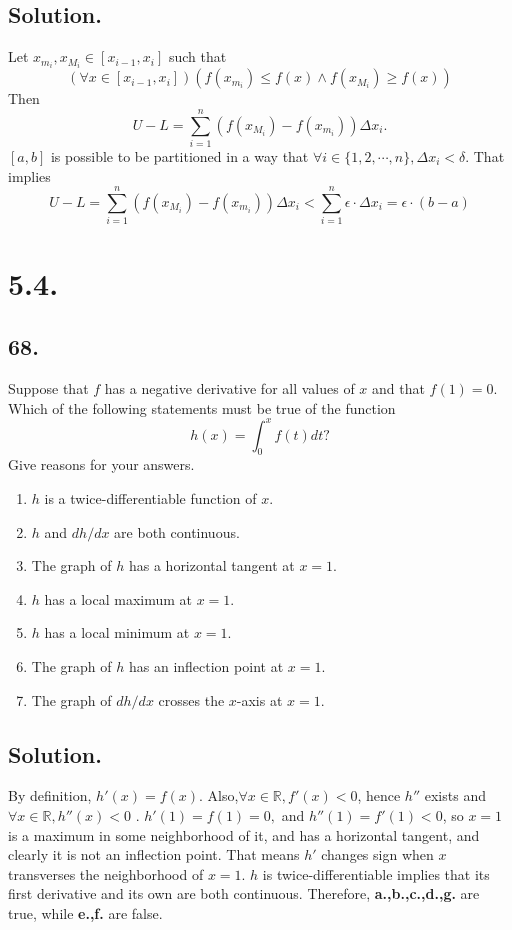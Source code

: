\documentclass{article}
\begin{document}
\subsection*{Solution.}
Let $x_{m_i},x_{M_i}\in [x_{i-1},x_i]$ such that 
\[(\forall x\in [x_{i-1},x_i])(f(x_{m_i})\leq f(x)\land f(x_{M_i})\geq f(x))\]
Then 
\[U-L=\sum_{i=1}^n(f(x_{M_i})-f(x_{m_i}))\Delta x_i.\]
$[a,b]$ is possible to be partitioned in a way that $\forall i\in\{1,2,\cdots,n\}, \Delta x_i<\delta$. That implies 
\[U-L=\sum_{i=1}^n(f(x_{M_i})-f(x_{m_i}))\Delta x_i<\sum_{i=1}^n\epsilon\cdot\Delta x_i=\epsilon\cdot (b-a)\]
\section*{5.4.}
\subsection*{68.}
Suppose that $f$ has a negative derivative for all values of $x$ and that $f(1)=0$. Which of the following statements must be true of the function
\[h(x)=\int_0^x f(t) dt?\]
Give reasons for your answers.
\begin{enumerate} [label=\textbf{\alph*.}]
    \item $h$ is a twice-differentiable function of $x$.
    \item $h$ and $dh/dx$ are both continuous.
    \item The graph of $h$ has a horizontal tangent at $x=1$.
    \item $h$ has a local maximum at $x=1$.
    \item $h$ has a local minimum at $x=1$.
    \item The graph of $h$ has an inflection point at $x=1$.
    \item The graph of $dh/dx$ crosses the $x$-axis at $x=1$.
\end{enumerate}
\subsection*{Solution.}
By definition, $h'(x)=f(x)$. Also,$\forall x\in \mathbb{R},f'(x)<0$, hence $h''$ exists and $\forall x\in \mathbb{R},h''(x)<0$ .\newline
$h'(1)=f(1)=0,$ and $h''(1)=f'(1)<0$, so $x=1$ is a maximum in some neighborhood of it, and has a horizontal tangent, and clearly it is not an inflection point. That means $h'$ changes sign when $x$ transverses the neighborhood of $x=1$. \newline
$h$ is twice-differentiable implies that its first derivative and its own  are both continuous. Therefore,\newline
\textbf{a.,b.,c.,d.,g.} are true, while \textbf{e.,f.} are false.
\end{document}
